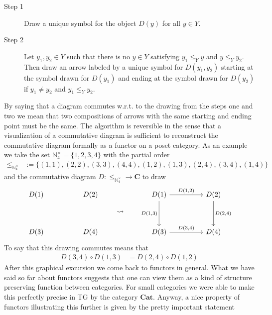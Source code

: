 \begin{description}
\item[Step 1]
Draw a unique symbol for the object $D(y)$ for all $y \in Y$.
\item[Step 2]
Let $y_{1},y_{2} \in Y$ such that there is no $y \in Y$ satisfying $y_{1} \leq_{Y} y$ and $y \leq_{Y} y_{2}$. Then draw an arrow labeled by a unique symbol for $D(y_{1},y_{2})$ starting at the symbol drawn for $D(y_{1})$ and ending at the symbol drawn for $D(y_{2})$ if $y_{1} \neq y_{2}$ and $y_{1} \leq_{Y} y_{2}$.
\end{description}
By saying that {\glqq}a diagram commutes{\grqq} w.r.t. to the drawing from the steps one and two we mean that two compositions of arrows with the same starting and ending point must be the same. The algorithm is reversible in the sense that a visualization of a commutative diagram is sufficient to reconstruct the commutative diagram formally as a functor on a poset category. As an example we take the set $\mathbb{N}_{4}^{\times} = \lbrace 1,2,3,4 \rbrace$ with the partial order
\begin{align*}
  \leq_{\mathbb{N}_{4}^{\times}}
  &:=
  \lbrace
    (1,1),
    (2,2),
    (3,3),
    (4,4),
    (1,2),
    (1,3),
    (2,4),
    (3,4),
    (1,4)
  \rbrace
\end{align*}
and the commutative diagram $D \colon \pmb{\leq}_{\mathbb{N}_{4}^{\times}} \rightarrow \mathbf{C}$ to draw
\[
\begin{tikzcd}[sep=huge]
  D(1)
  &
  D(2)
  \\
  D(3)
  &
  D(4)
\end{tikzcd}
\qquad
\rightsquigarrow
\qquad
\begin{tikzcd}[sep=huge]
  D(1)
  \arrow{r}{D(1,2)}
  \arrow[swap]{d}{D(1,3)}
  &
  D(2)
  \arrow{d}{D(2,4)}
  \\
  D(3)
  \arrow{r}{D(3,4)}
  &
  D(4)
\end{tikzcd}
\]
To say that this drawing commutes means that
\begin{align*}
  D(3,4)
  \circ
  D(1,3)
  &=
  D(2,4)
  \circ
  D(1,2)
\end{align*}
After this graphical excursion we come back to functors in general. What we have said so far about functors suggests that one can view them as a kind of structure preserving function between categories. For small categories we were able to make this perfectly precise in TG by the category $\mathbf{Cat}$. Anyway, a nice property of functors illustrating this further is given by the pretty important statement
